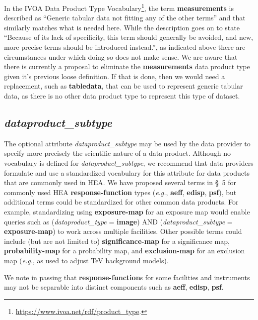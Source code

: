 \documentclass[11pt,a4paper]{ivoa}
\begin{document}
In the \gls{IVOA} Data Product Type Vocabulary\footnote{\url{https://www.ivoa.net/rdf/product_type}.}, the term {\bf measurements} is described as ``Generic tabular data not fitting any of the other terms'' and that similarly matches what is needed here.  While the description goes on to state ``Because of its lack of specificity, this term should generally be avoided, and new, more precise terms should be introduced instead.'', as indicated above there are circumstances under which doing so does not make sense.  We are aware that there is currently a proposal to eliminate the {\bf measurements} data product type given it's previous loose definition.  If that is done, then we would need a replacement, such as {\bf tabledata\/}, that can be used to represent generic tabular data, as there is no other data product type to represent this type of dataset.

\subsection{{\em dataproduct\_subtype}}

The optional attribute {\em dataproduct\_subtype} may be used by the data provider to specify more precisely the scientific nature of a data product.  Although no vocabulary is defined for {\em dataproduct\_subtype\/}, we recommend that data providers formulate and use a standardized vocabulary for this attribute for data products that are commonly used in \gls{HEA}\null.  We have proposed several terms in \S~5 for commonly used \gls{HEA} {\bf response-function} types ({\em e.g.\/}, {\bf aeff}, {\bf edisp}, {\bf psf}), but additional terms could be standardized for other common data products.  For example, standardizing using {\bf exposure-map} for an exposure map would enable queries such as  ({\em dataproduct\_type\/} = {\bf image}) AND ({\em dataproduct\_subtype\/} = {\bf exposure-map}) to work across multiple facilities.  Other possible terms could include (but are not limited to) {\bf significance-map} for a significance map, {\bf probability-map} for a probability map, and {\bf exclusion-map} for an exclusion map ({\em e.g.\/}, as used to adjust TeV background models).

We note in passing that {\bf response-function}s for some facilities and instruments may not be separable into distinct components such as {\bf aeff}, {\bf edisp}, {\bf psf}.
\end{document}
